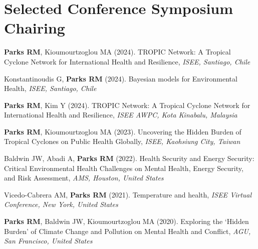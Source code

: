 \section*{Selected Conference Symposium Chairing}

\noindent \textbf{Parks RM}, Kioumourtzoglou MA (2024). TROPIC Network: A Tropical Cyclone Network for International Health and Resilience, \textit{ISEE, Santiago, Chile} \bigskip

\noindent Konstantinoudis G, \textbf{Parks RM} (2024). Bayesian models for Environmental Health, \textit{ISEE, Santiago, Chile} \bigskip

\noindent \textbf{Parks RM}, Kim Y (2024). TROPIC Network: A Tropical Cyclone Network for International Health and Resilience, \textit{ISEE AWPC, Kota Kinabalu, Malaysia} \bigskip

\noindent \textbf{Parks RM},  Kioumourtzoglou MA (2023). Uncovering the Hidden Burden of Tropical Cyclones on Public Health Globally, \textit{ISEE, Kaohsiung City, Taiwan} \bigskip

\noindent Baldwin JW,  Abadi A, \textbf{Parks RM} (2022). Health Security and Energy Security: Critical Environmental Health Challenges on Mental Health, Energy Security, and Risk Assessment, \textit{AMS, Houston, United States} \bigskip

\noindent Vicedo-Cabrera AM, \textbf{Parks RM} (2021). Temperature and health, \textit{ISEE Virtual Conference, New York, United States} \bigskip

\noindent \textbf{Parks RM}, Baldwin JW,  Kioumourtzoglou MA (2020). Exploring the ‘Hidden Burden’ of Climate Change and Pollution on Mental Health and Conflict, \textit{AGU, San Francisco, United States} \bigskip

